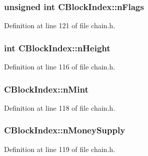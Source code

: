 \subsubsection[{n\+Flags}]{\setlength{\rightskip}{0pt plus 5cm}unsigned int C\+Block\+Index\+::n\+Flags}\label{class_c_block_index_a02aaba7d27ec615e6f9f740353d839de}


Definition at line 121 of file chain.\+h.

\hypertarget{class_c_block_index_aebfc8d6b95852546760e742553d7bfd5}{}
\subsubsection[{n\+Height}]{\setlength{\rightskip}{0pt plus 5cm}int C\+Block\+Index\+::n\+Height}\label{class_c_block_index_aebfc8d6b95852546760e742553d7bfd5}


Definition at line 116 of file chain.\+h.

\hypertarget{class_c_block_index_a6559fddea3401548ae144e870d150359}{}
\subsubsection[{n\+Mint}]{ C\+Block\+Index\+::n\+Mint}\label{class_c_block_index_a6559fddea3401548ae144e870d150359}


Definition at line 118 of file chain.\+h.

\hypertarget{class_c_block_index_a309fdc44d871b336abe64eadf250cafd}{}
\subsubsection[{n\+Money\+Supply}]{ C\+Block\+Index\+::n\+Money\+Supply}\label{class_c_block_index_a309fdc44d871b336abe64eadf250cafd}


Definition at line 119 of file chain.\+h.

\hypertarget{class_c_block_index_a5e0a648ed1df8da171eba636d5ebef01}{}
